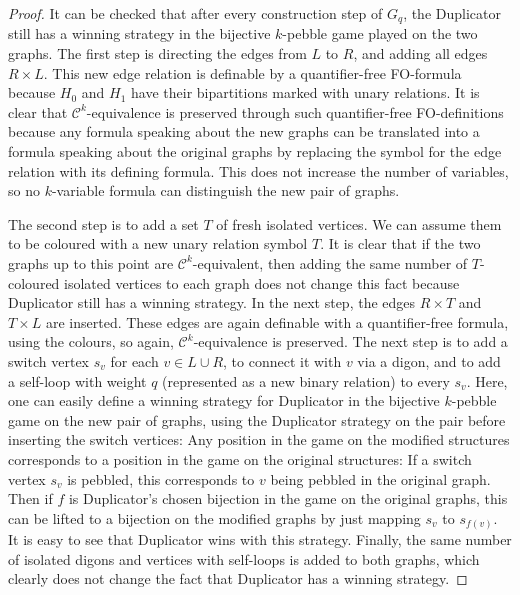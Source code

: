 \documentclass[10pt,a4paper]{article}
\theoremstyle{definition}
\theoremstyle{plain}
\theoremstyle{remark}
\begin{document}
\begin{proof}
	It can be checked that after every construction step of $G_q$, the Duplicator still has a winning strategy in the bijective $k$-pebble game played on the two graphs.  
	The first step is directing the edges from $L$ to $R$, and adding all edges $ R \times L$. This new edge relation is definable by a quantifier-free FO-formula because $H_0$ and $H_1$ have their bipartitions marked with unary relations.
	It is clear that $\mathcal{C}^k$-equivalence is preserved through such quantifier-free FO-definitions because any formula speaking about the new graphs can be translated into a formula speaking about the original graphs by replacing the symbol for the edge relation with its defining formula. This does not increase the number of variables, so no $k$-variable formula can distinguish the new pair of graphs.
	 
	The second step is to add a set $T$ of fresh isolated vertices. We can assume them to be coloured with a new unary relation symbol $T$. It is clear that if the two graphs up to this point are $\mathcal{C}^k$-equivalent, then adding the same number of $T$-coloured isolated vertices to each graph does not change this fact because Duplicator still has a winning strategy. In the next step, the edges $R \times T$ and $T \times L$ are inserted. These edges are again definable with a quantifier-free formula, using the colours, so again, $\mathcal{C}^k$-equivalence is preserved.
	The next step is to add a switch vertex $s_v$ for each $v \in L \cup R$, to connect it with $v$ via a digon, and to add a self-loop with weight $q$ (represented as a new binary relation) to every $s_v$.
	Here, one can easily define a winning strategy for Duplicator in the bijective $k$-pebble game on the new pair of graphs, using the Duplicator strategy on the pair before inserting the switch vertices: Any position in the game on the modified structures corresponds to a position in the game on the original structures: If a switch vertex $s_v$ is pebbled, this corresponds to $v$ being pebbled in the original graph. Then if $f$ is Duplicator's chosen bijection in the game on the original graphs, this can be lifted to a bijection on the modified graphs by just mapping $s_{v}$ to $s_{f(v)}$. It is easy to see that Duplicator wins with this strategy. 
	Finally, the same number of isolated digons and vertices with self-loops is added to both graphs, which clearly does not change the fact that Duplicator has a winning strategy.
\end{proof}	
\end{document}
